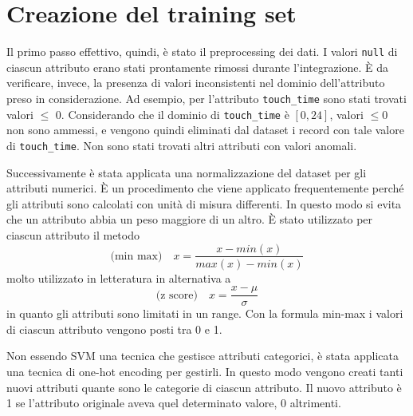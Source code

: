 \section{Creazione del training set}

Il primo passo effettivo, quindi, è stato il preprocessing dei dati. I valori \texttt{null} di ciascun attributo erano stati prontamente rimossi durante l’integrazione. È da verificare, invece, la presenza di valori inconsistenti nel dominio dell’attributo preso in considerazione.
Ad esempio, per l’attributo \texttt{touch\_time} sono stati trovati valori $\leq$ 0. Considerando che il dominio di \texttt{touch\_time} è $[0, 24]$, valori $\leq 0$ non sono ammessi, e vengono quindi eliminati dal dataset i record con tale valore di \texttt{touch\_time}. Non sono stati trovati altri attributi con valori anomali.

\par
Successivamente è stata applicata una normalizzazione del dataset per gli attributi numerici. È un procedimento che viene applicato frequentemente perché gli attributi sono calcolati con unità di misura differenti. In questo modo si evita che un attributo abbia un peso maggiore di un altro. È stato utilizzato per ciascun attributo il metodo
$$ \text{(min max)}\quad x = \dfrac{x - min(x)}{max(x) - min(x)} $$ 
molto utilizzato in letteratura in alternativa a
$$\text{(z score)}\quad x = \dfrac{x - \mu}{\sigma} $$
 in quanto gli attributi sono limitati in un range. Con la formula min-max i valori di ciascun attributo vengono posti tra 0 e 1.

\par
Non essendo SVM una tecnica che gestisce attributi categorici, è stata applicata una tecnica di one-hot encoding per gestirli. In questo modo vengono creati tanti nuovi attributi quante sono le categorie di ciascun attributo. Il nuovo attributo è 1 se l’attributo originale aveva quel determinato valore, 0 altrimenti.